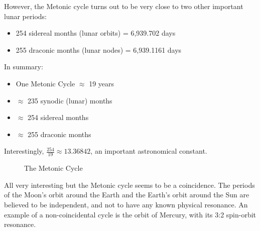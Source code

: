 \documentclass[11pt, oneside]{article}   	%
\theoremstyle{definition}
\begin{document}
\bigskip
\noindent
However, the Metonic cycle turns out to be very close to two other important lunar periods:

\begin{itemize}
\item 254 sidereal months (lunar orbits) = 6,939.702 days
\item 255 draconic months (lunar nodes) = 6,939.1161 days
\end{itemize}

\bigskip
\noindent
In summary: 

\begin{itemize}
\item One Metonic Cycle $\approx$ 19 years 
\item $\approx$ 235 synodic (lunar) months
\item $\approx$ 254 sidereal months
\item $\approx$ 255 draconic months
\end{itemize}

\bigskip
\noindent
Interestingly, $\frac{254}{19} \approx 13.36842$, an important astronomical constant. 


\bigskip
\begin{figure}[H]
\caption{The Metonic Cycle \cite{youtube:freeth2021}}
\label{fig:metonic_cycle}
\end{figure}



\bigskip
\noindent
All very interesting but the Metonic cycle seems to be a coincidence. The periods of the Moon's orbit around the Earth and the Earth's 
orbit around the Sun are believed to be independent, and not to have any known physical resonance. An example of a non-coincidental 
cycle is the orbit of Mercury, with its 3:2 spin-orbit resonance.
\end{document}
